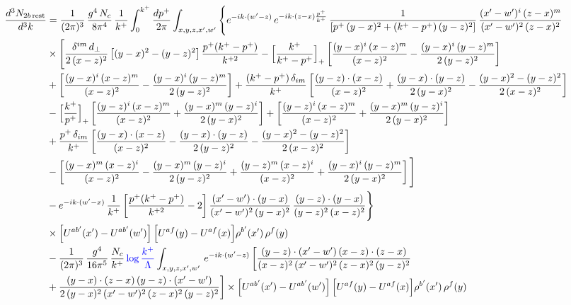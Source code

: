 \documentclass[9pt]{article}
\numberwithin{equation}{section}
\begin{document}
\begin{align}
\frac{d^{3}N_{2b\,\rm rest}}{d^{3}k} & =\frac{1}{(2\pi)^{3}}\,\frac{g^{4}\,N_{c}}{8\pi^{4}}\,\frac{1}{k^{+}}\int_{0}^{k^{+}}\frac{dp^{+}}{2\pi}\int_{x,y,z,x',w'}\Bigg\{e^{-ik\cdot(w'-z)}\,e^{-ik\cdot(z-x)\frac{p^{+}}{k^{+}}}\,\frac{1}{\left[p^{+}\,(y-x)^{2}+(k^{+}-p^{+})\,(y-z)^{2}\right]}\,\frac{(x'-w')^{i}\,(z-x)^{m}}{(x'-w')^{2}\,(z-x)^{2}}\notag\\
&\times\Bigg[\frac{\delta^{im}\,d_{\perp}}{2\,(x-z)^{2}}\left[(y-x)^{2}-(y-z)^{2}\right]\frac{p^{+}(k^{+}-p^{+})}{k^{+2}}
-\Big[\frac{k^{+}}{k^{+}-p^{+}}\Big]_{+}\left[\frac{(y-x)^{i}\,(x-z)^{m}}{(x-z)^{2}}-\frac{(y-x)^{i}\,(y-z)^{m}}{2\,(y-z)^{2}}\right]\notag\\
&+\left[\frac{(y-x)^{i}\,(x-z)^{m}}{(x-z)^{2}}-\frac{(y-x)^{i}\,(y-z)^{m}}{2\,(y-z)^{2}}\right]
+\frac{(k^{+}-p^{+})\,\delta_{im}}{k^{+}}\left[\frac{(y-z)\cdot(x-z)}{(x-z)^{2}}+\frac{(y-x)\cdot(y-z)}{2\,(y-x)^{2}}-\frac{(y-x)^{2}-(y-z)^{2}}{2\,(x-z)^{2}}\right]\notag\\
&-\Big[\frac{k^{+}}{p^{+}}\Big]_{+}\left[\frac{(y-z)^{i}\,(x-z)^{m}}{(x-z)^{2}}+\frac{(y-x)^{m}\,(y-z)^{i}}{2\,(y-x)^{2}}\right]+\left[\frac{(y-z)^{i}\,(x-z)^{m}}{(x-z)^{2}}+\frac{(y-x)^{m}\,(y-z)^{i}}{2\,(y-x)^{2}}\right]\notag\\
&+\frac{p^{+}\,\delta_{im}}{k^{+}}\left[\frac{(y-x)\cdot(x-z)}{(x-z)^{2}}-\frac{(y-x)\cdot(y-z)}{2\,(y-z)^{2}}-\frac{(y-x)^{2}-(y-z)^{2}}{2\,(x-z)^{2}}\right]\notag\\
&-\left[\frac{(y-x)^{m}\,(x-z)^{i}}{(x-z)^{2}}-\frac{(y-x)^{m}\,(y-z)^{i}}{2\,(y-z)^{2}}+\frac{(y-z)^{m}\,(x-z)^{i}}{(x-z)^{2}}+\frac{(y-x)^{i}\,(y-z)^{m}}{2\,(y-x)^{2}}\right]\Bigg]\notag\\
&-e^{-ik\cdot(w'-x)}\,\frac{1}{k^{+}}\left[\frac{p^{+}(k^{+}-p^{+})}{k^{+2}}-2\right]\frac{(x'-w')\cdot(y-x)}{(x'-w')^{2}\,(y-x)^{2}}\,\frac{(y-z)\cdot(y-x)}{(y-z)^{2}\,(x-z)^{2}}\Bigg\}\notag\\
&\times\Big[U^{ab'}(x')-U^{ab'}(w')\Big]\,\Big[U^{af}(y)-U^{af}(x)\Big]\rho^{b'}(x')\,\rho^{f}(y)\notag \\ & -\frac{1}{(2\pi)^{3}}\,\frac{g^{4}}{16\pi^{5}}\,\frac{N_{c}}{k^{+}}\,{\color{blue}\log\frac{k^{+}}{\Lambda}}\int_{x,y,z,x',w'}\,e^{-ik\cdot(w'-z)}\,\bigg[\frac{(y-z)\cdot (x'-w')\,(x-z)\cdot (z-x)}{(x-z)^{2}\,(x'-w')^{2}\,(z-x)^{2}\,(y-z)^{2}}\notag \\ & +\frac{(y-x)\cdot (z-x)\,(y-z)\cdot (x'-w')}{2\,(y-x)^{2}\,(x'-w')^{2}\,(z-x)^{2}\,(y-z)^{2}}\bigg]\times\Big[U^{ab'}(x')-U^{ab'}(w')\Big]\,\Big[U^{af}(y)-U^{af}(x)\Big]\rho^{b'}(x')\,\rho^{f}(y)\notag\\

\end{align}
\end{document}

